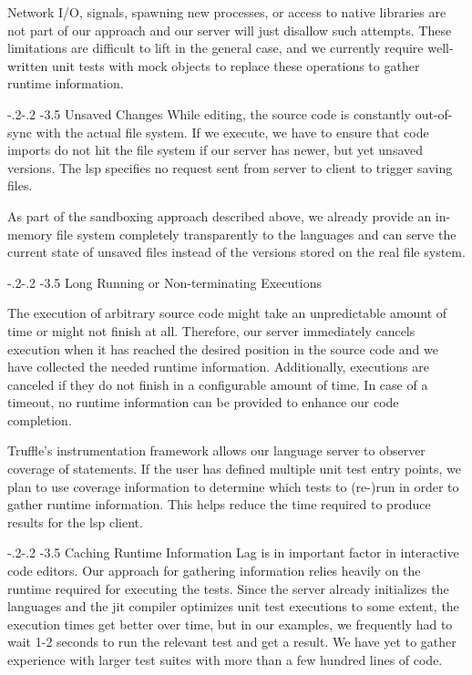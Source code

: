 \documentclass[sigplan,10pt,screen]{acmart}
\makeatletter
\renewcommand\paragraph{\@startsection{paragraph}{4}{\z@}%
   {-.2\baselineskip \@plus -2\p@ \@minus -.2\p@}%
   {-3.5\p@}%
   {\@parfont\@addspaceafter}}
\makeatother
\begin{document}
Network I/O, signals, spawning new processes, or access to native libraries are
not part of our approach and our server will just disallow such attempts. These
limitations are difficult to lift in the general case, and we currently require
well-written unit tests with mock objects to replace these operations to gather
runtime information.

\paragraph{Unsaved Changes}
While editing, the source code is constantly out-of-sync with the actual file
system. If we execute, we have to ensure that code imports do not hit the file
system if our server has newer, but yet unsaved versions. The \ac{lsp} specifies
no request sent from server to client to trigger saving files.

As part of the sandboxing approach described above, we already provide an
in-memory file system completely transparently to the languages and can serve the
current state of unsaved files instead of the versions stored on the real
file system.

\paragraph{Long Running or Non-terminating Executions}

The execution of arbitrary source code might take an unpredictable amount of
time or might not finish at all. Therefore, our server immediately cancels
execution when it has reached the desired position in the source code and we
have collected the needed runtime information. Additionally, executions are
canceled if they do not finish in a configurable amount of time. In case of a
timeout, no runtime information can be provided to enhance our code completion.

Truffle's instrumentation framework allows our language server to observer
coverage of statements. If the user has defined multiple unit test entry points,
we plan to use coverage information to determine which tests to (re-)run in
order to gather runtime information. This helps reduce the time required to
produce results for the \ac{lsp} client.

\paragraph{Caching Runtime Information}
Lag is in important factor in interactive code editors. Our approach for
gathering information relies heavily on the runtime required for executing the
tests. Since the server already initializes the languages and the \ac{jit}
compiler optimizes unit test executions to some extent, the execution times get
better over time, but in our examples, we frequently had to wait 1-2 seconds to
run the relevant test and get a result. We have yet to gather experience with
larger test suites with more than a few hundred lines of code.
\end{document}
